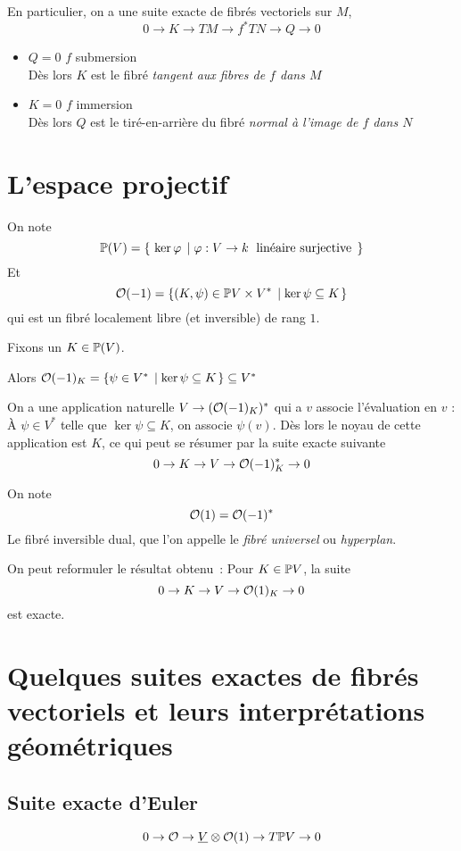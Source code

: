 \documentclass[a4paper,10pt,draft]{article}
\begin{document}
En particulier, on a une suite exacte de fibrés vectoriels sur $M$, 
\[
0 \rightarrow K \rightarrow TM \rightarrow f^*TN \rightarrow Q \rightarrow 0
\]

\begin{itemize}
\item $Q = 0$ \ssi $f$ submersion \\
Dès lors $K$ est le fibré \textit{tangent aux fibres de $f$ dans $M$}
\item $K = 0$ \ssi $f$ immersion \\
Dès lors $Q$ est le tiré-en-arrière du fibré \textit{normal à l'image de $f$ dans $N$}
\end{itemize}




\section{L'espace projectif}
On note
\[
\mathbb{P}(V) = \left\lbrace {\ \ker \varphi} \; \left| \; {\varphi : V \rightarrow k \; \text{ linéaire surjective }} \right. \right\rbrace
\]
Et
\[
\mathcal{O}(-1) = \left\lbrace {(K,\psi)\in \mathbb{P}V \times V^*} \; \left| \; {\ker \psi \subseteq K} \right. \right\rbrace
\]
qui est un fibré localement libre (et inversible) de rang $1$.

Fixons un $K \in \mathbb{P}(V)$.

Alors $\mathcal{O}(-1)_K = \left\lbrace {\psi \in V^*} \; \left| \; {\ker \psi \subseteq K} \right. \right\rbrace \subseteq V^*$

On a une application naturelle
$V \rightarrow (\mathcal{O}(-1)_K)^*$ qui a $v$ associe l'évaluation en $v$ : À $\psi \in V^*$ telle que $\ker \psi \subseteq K$, on associe $\psi(v)$. Dès lors le noyau de cette application est $K$, ce qui peut se résumer par la suite exacte suivante
\[
0 \rightarrow K \rightarrow V \rightarrow \mathcal{O}(-1)_K^* \rightarrow 0
\]

\begin{defi}
On note
\[
\mathcal{O}(1) = \mathcal{O}(-1)^*
\]
Le fibré inversible dual, que l'on appelle le \textit{fibré universel} ou \textit{hyperplan}.
\end{defi}
On peut reformuler le résultat obtenu~:
Pour $K \in \mathbb{P} V$, la suite
\[
0\rightarrow K \rightarrow V \rightarrow \mathcal{O}(1)_K \rightarrow 0
\]
est exacte.

\section{Quelques suites exactes de fibrés vectoriels et leurs interprétations géométriques}
\subsection{Suite exacte d'Euler}
\[
0 \rightarrow \mathcal{O} \rightarrow \underline{V} \otimes \mathcal{O}(1) \rightarrow T\mathbb{P} V \rightarrow 0
\]
\end{document}
